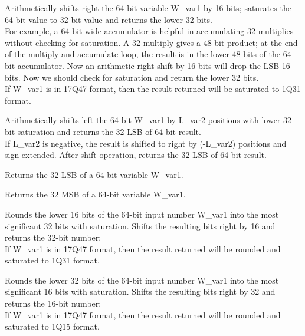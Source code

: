 
Arithmetically shifts right the 64-bit variable W\_var1 by 16 bits; saturates the 64-bit value to 32-bit value and returns the lower 32 bits.\\
For example, a 64-bit wide accumulator is helpful in accumulating 32 multiplies without checking for saturation.
A 32 multiply gives a 48-bit product; at the end of the multiply-and-accumulate loop, the result is in the lower 48 bits of the 64-bit accumulator.
Now an arithmetic right shift by 16 bits will drop the LSB 16 bits.
Now we should check for saturation and return the lower 32 bits.\\
If W\_var1 is in 17Q47 format, then the result returned will be saturated to 1Q31 format.


Arithmetically shifts left the 64-bit W\_var1 by L\_var2 positions with lower 32-bit saturation and returns the 32 LSB of 64-bit result.\\
If L\_var2 is negative, the result is shifted to right by (-L\_var2) positions and sign extended.
After shift operation, returns the 32 LSB of 64-bit result.


Returns the 32 LSB of a 64-bit variable W\_var1.


Returns the 32 MSB of a 64-bit variable W\_var1.


Rounds the lower 16 bits of the 64-bit input number W\_var1 into the most significant 32 bits with saturation.
Shifts the resulting bits right by 16 and returns the 32-bit number:\\
If W\_var1 is in 17Q47 format, then the result returned will be rounded and saturated to 1Q31 format.


Rounds the lower 32 bits of the 64-bit input number W\_var1 into the most significant 16 bits with saturation.
Shifts the resulting bits right by 32 and returns the 16-bit number:\\
If W\_var1 is in 17Q47 format, then the result returned will be rounded and saturated to 1Q15 format.

